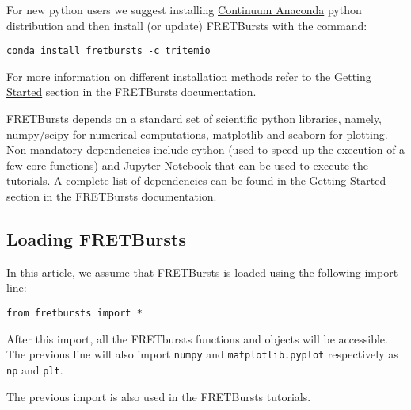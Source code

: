 For new python users we suggest installing 
\href{https://store.continuum.io/cshop/anaconda/}{Continuum Anaconda}
python distribution and then install (or update) FRETBursts with the command:

\begin{verbatim}
conda install fretbursts -c tritemio
\end{verbatim}

For more information on different installation methods refer to the 
\href{http://fretbursts.readthedocs.org/en/latest/getting_started.html}{Getting Started}
section in the FRETBursts documentation.

FRETBursts depends on a standard set of scientific 
python libraries, namely, \href{http://www.numpy.org/}{numpy}/\href{http://www.scipy.org/}{scipy} for numerical computations, 
\href{http://matplotlib.org/}{matplotlib} and \href{http://stanford.edu/~mwaskom/software/seaborn/}{seaborn} for plotting. Non-mandatory dependencies include \href{http://cython.org/}{cython} (used to speed up the execution of a few core functions)
and \href{http://ipython.org/notebook.html}{Jupyter Notebook} that can be used
to execute the tutorials.
A complete list of dependencies can be found in the 
\href{http://fretbursts.readthedocs.org/en/latest/getting_started.html}{Getting Started}
section in the FRETBursts documentation.

\subsection{Loading FRETBursts}
\label{sec:import}
In this article, we assume that FRETBursts is loaded using the following 
import line:

\begin{verbatim}
from fretbursts import *
\end{verbatim}

After this import, all the FRETbursts functions and objects will be accessible.
The previous line will also import \verb|numpy| and \verb|matplotlib.pyplot|
respectively as \verb|np| and \verb|plt|.

The previous import is also used in the FRETBursts tutorials.